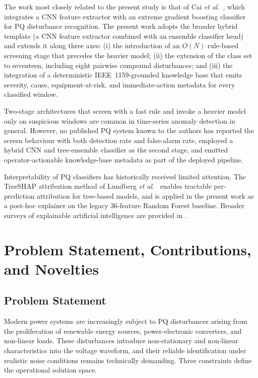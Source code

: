 \documentclass[conference]{IEEEtran}
\begin{document}
The work most closely related to the present study is that of Cai
\emph{et al.}\ \cite{cai2021hybrid}, which integrates a CNN feature
extractor with an extreme gradient boosting classifier for PQ
disturbance recognition. The present work adopts the broader hybrid
template (a CNN feature extractor combined with an ensemble
classifier head) and extends it along three axes: (i) the
introduction of an $O(N)$ rule-based screening stage that precedes the
heavier model; (ii) the extension of the class set to seventeen,
including eight pairwise compound disturbances; and (iii) the
integration of a deterministic IEEE~1159-grounded knowledge base that
emits severity, cause, equipment-at-risk, and immediate-action metadata
for every classified window.

Two-stage architectures that screen with a fast rule and invoke a
heavier model only on suspicious windows are common in time-series
anomaly detection in general. However, no published PQ system known
to the authors has reported the screen behaviour with
both detection rate and false-alarm rate, employed a hybrid CNN and
tree-ensemble classifier as the second stage, and emitted
operator-actionable knowledge-base metadata as part of the deployed
pipeline.

Interpretability of PQ classifiers has historically received limited
attention. The TreeSHAP attribution method of Lundberg \emph{et al.}\
\cite{lundberg2020trees} enables tractable per-prediction attribution
for tree-based models, and is applied in the present work as a
post-hoc explainer on the legacy 36-feature Random Forest baseline.
Broader surveys of explainable artificial intelligence are provided in
\cite{linardatos2021xai}.

\section{Problem Statement, Contributions, and Novelties}
\label{sec:problem}
\subsection{Problem Statement}
Modern power systems are increasingly subject to PQ disturbances
arising from the proliferation of renewable energy sources,
power-electronic converters, and non-linear loads. These disturbances
introduce non-stationary and non-linear characteristics into the
voltage waveform, and their reliable identification under realistic
noise conditions remains technically demanding. Three constraints
define the operational solution space.
\end{document}
